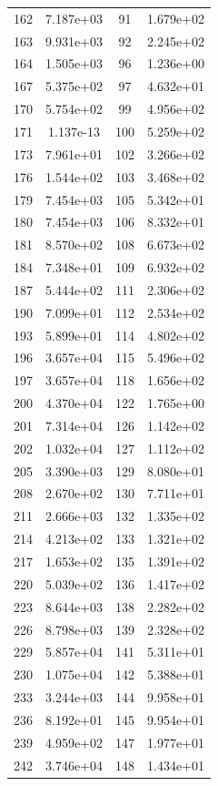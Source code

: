 \documentclass[12pt]{article}
\begin{document}
\begin{longtable}{@{}cccc@{}}
162 & 7.187e+03 & 91 & 1.679e+02 \\
163 & 9.931e+03 & 92 & 2.245e+02 \\
164 & 1.505e+03 & 96 & 1.236e+00 \\
167 & 5.375e+02 & 97 & 4.632e+01 \\
170 & 5.754e+02 & 99 & 4.956e+02 \\
171 & 1.137e-13 & 100 & 5.259e+02 \\
173 & 7.961e+01 & 102 & 3.266e+02 \\
176 & 1.544e+02 & 103 & 3.468e+02 \\
179 & 7.454e+03 & 105 & 5.342e+01 \\
180 & 7.454e+03 & 106 & 8.332e+01 \\
181 & 8.570e+02 & 108 & 6.673e+02 \\
184 & 7.348e+01 & 109 & 6.932e+02 \\
187 & 5.444e+02 & 111 & 2.306e+02 \\
190 & 7.099e+01 & 112 & 2.534e+02 \\
193 & 5.899e+01 & 114 & 4.802e+02 \\
196 & 3.657e+04 & 115 & 5.496e+02 \\
197 & 3.657e+04 & 118 & 1.656e+02 \\
200 & 4.370e+04 & 122 & 1.765e+00 \\
201 & 7.314e+04 & 126 & 1.142e+02 \\
202 & 1.032e+04 & 127 & 1.112e+02 \\
205 & 3.390e+03 & 129 & 8.080e+01 \\
208 & 2.670e+02 & 130 & 7.711e+01 \\
211 & 2.666e+03 & 132 & 1.335e+02 \\
214 & 4.213e+02 & 133 & 1.321e+02 \\
217 & 1.653e+02 & 135 & 1.391e+02 \\
220 & 5.039e+02 & 136 & 1.417e+02 \\
223 & 8.644e+03 & 138 & 2.282e+02 \\
226 & 8.798e+03 & 139 & 2.328e+02 \\
229 & 5.857e+04 & 141 & 5.311e+01 \\
230 & 1.075e+04 & 142 & 5.388e+01 \\
233 & 3.244e+03 & 144 & 9.958e+01 \\
236 & 8.192e+01 & 145 & 9.954e+01 \\
239 & 4.959e+02 & 147 & 1.977e+01 \\
242 & 3.746e+04 & 148 & 1.434e+01 \\

\end{longtable}
\end{document}
